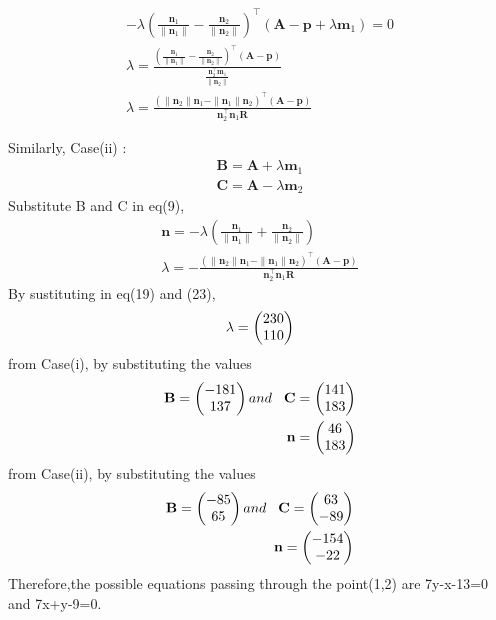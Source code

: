 \begin{align}
-\lambda(\frac{\textbf{n}_{1}}{\| \textbf{n}_{1} \|}-\frac{\textbf{n}_{2}}{\| \textbf{n}_{2} \|})^\top(\textbf{A}-\textbf{p}+\lambda\textbf{m}_{1})=0 \\
\lambda=\frac{(\frac{\textbf{n}_{1}}{\| \textbf{n}_{1} \|}-\frac{\textbf{n}_{2}}{\| \textbf{n}_{2} \|})^\top(\textbf{A}-\textbf{p})}{\frac{\textbf{n}_{2}^\top\textbf{m}_{1}}{\| \textbf{n}_{2} \|}}\\
\lambda=\frac{(\| \textbf{n}_{2} \|\textbf{n}_{1}-\| \textbf{n}_{1} \|\textbf{n}_{2})^\top(\textbf{A}-\textbf{p})}{\textbf{n}_{2}^\top\textbf{n}_{1}\textbf{R}}
\end{align}
\raggedright Similarly, Case(ii) : \\
\begin{align}
\textbf{B} = \textbf{A}+\lambda\textbf{m}_{1}\\
\textbf{C} = \textbf{A}-\lambda\textbf{m}_{2}
\end{align}
Substitute B and C in eq(9),\\
\begin{align}
\textbf{n}=-\lambda(\frac{\textbf{n}_{1}}{\| \textbf{n}_{1} \|}+\frac{\textbf{n}_{2}}{\| \textbf{n}_{2} \|})\\
\lambda=-\frac{(\| \textbf{n}_{2} \|\textbf{n}_{1}-\| \textbf{n}_{1} \|\textbf{n}_{2})^\top(\textbf{A}-\textbf{p})}{\textbf{n}_{2}^\top\textbf{n}_{1}\textbf{R}}
\end{align}
By sustituting in eq(19) and (23),
\begin{align}
\lambda=\begin{pmatrix}230 \\ 110\end{pmatrix}
\end{align}
from Case(i), by substituting the values \\
\begin{align}
\textbf{B}=\begin{pmatrix}-181 \\ 137\end{pmatrix} and\hspace{0.3cm}\textbf{C}=\begin{pmatrix}141 \\ 183\end{pmatrix} \\
\textbf{n}=\begin{pmatrix}46\\ 183\end{pmatrix}
\end{align}
from Case(ii), by substituting the values \\
\begin{align}
\textbf{B}=\begin{pmatrix}-85 \\ 65\end{pmatrix} and \hspace{0.3cm}\textbf{C}=\begin{pmatrix}63 \\ -89\end{pmatrix} \\
\textbf{n}=\begin{pmatrix}-154\\ -22\end{pmatrix} 
\end{align}
        Therefore,the possible equations passing through the point(1,2) are 7y-x-13=0 and 7x+y-9=0.\\
